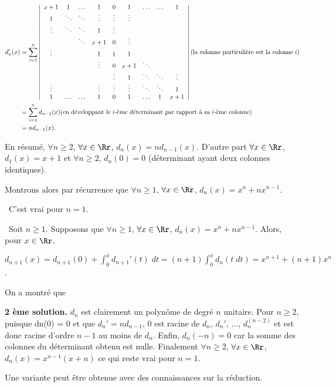 {\begin{enumerate}
{\begin{align*}\ensuremath
d_n'(x)&=\sum_{i=1}^{n}\left|
\begin{array}{ccccccccc}
x+1&1&\ldots&1&0&1&\ldots&\ldots&1\\
1&\ddots&\ddots&\vdots&\vdots&\vdots\\
\vdots&\ddots&\ddots&1&\vdots\\
 & &\ddots&x+1&0&\vdots\\
\vdots& & &1&1&1\\
 & & &\vdots&0&x+1&\ddots\\
 & & & &\vdots&1&\ddots&\ddots&\vdots\\
\vdots& & &\vdots&\vdots&\vdots&\ddots&\ddots&1\\
1&\ldots&\ldots&1&0&1&\ldots&1&x+1
\end{array}
\right|(\text{la colonne particulière est la colonne}\;i)\\
 &=\sum_{i=1}^{n}d_{n-1}(x)(\text{en développant le}\;i\text{-ème déterminant par rapport à sa}\;i\text{-ème colonne})\\
 &=nd_{n-1}(x).
\end{align*}

En résumé, $\forall n\geqslant 2$, $\forall x\in\Rr$, $d_n(x)=nd_{n-1}(x)$. D'autre part $\forall x\in\Rr$, $d_1(x)=x+1$ et $\forall n\geqslant 2$, $d_n(0) = 0$ (déterminant ayant deux colonnes identiques).

Montrons alors par récurrence que 
$\forall n\geqslant 1$, $\forall x\in\Rr$, $d_n(x) =x^n+nx^{n-1}$.

\textbullet~C'est vrai pour $n=1$.

\textbullet~Soit $n\geqslant1$. Supposons que $\forall n\geqslant 1$, $\forall x\in\Rr$, $d_n(x) =x^n+nx^{n-1}$. Alors, pour $x\in\Rr$,

\begin{center}
$d_{n+1}(x)=d_{n+1}(0)+\int_{0}^{x}d_{n+1}'(t)\;dt=(n+1)\int_{0}^{x}d_n(t\;dt)=x^{n+1}+(n+1)x^n$.
\end{center}

On a montré que

\begin{center}
\end{center}

\textbf{2 ème solution.} $d_n$ est clairement un polynôme de degré $n$ unitaire.
Pour $n\geqslant 2$, puisque dn(0) = 0 et que $d_n'= nd_{n-1}$, $0$ est racine de $d_n$, $d_n'$, ..., $d_n^{(n-2)}$ et est donc racine d'ordre $n-1$ au moins de $d_n$. 
Enfin, $d_n(-n)=0$ car la somme des colonnes du déterminant obtenu est nulle.
Finalement $\forall n\geqslant2$, $\forall x\in\Rr$, $d_n(x) = x^{n-1}(x+n)$ ce qui reste vrai pour $n=1$.

Une variante peut être obtenue avec des connaissances sur la réduction.}
\end{enumerate}
}
